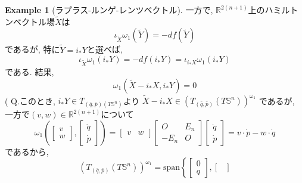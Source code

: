\documentclass[a4paper]{ujarticle}
\numberwithin{equation}{section}
\theoremstyle{definition}
\newtheorem{example}{Example}
\begin{document}
\begin{example}[ラプラス-ルンゲ-レンツベクトル]
            一方で, $\mathbb{R}^{2(n+1)}$上のハミルトンベクトル場$\tilde{X}$は
            \[
                \iota_{\tilde{X}}\omega_1(\tilde{Y}) = - d f(\tilde{Y})
            \]
            であるが, 特に$\tilde{Y} = i_{*} Y$と選べば,
            \[
                \iota_{\tilde{X}}\omega_1(i_{*}Y) = - d f(i_{*}Y) = \iota_{i_{*}X} \omega_1(i_{*}Y)
            \]
            である. 結果, 
            \[
                \omega_1(\tilde{X} - i_{*}X, i_{*}Y) = 0
            \]
            (   Q.このとき, $i_{*}Y \in T_{(\bar{q}, \bar{p})(T \mathbb{S}^n)}$より
                $\tilde{X} - i_{*}X \in (T_{(\bar{q}, \bar{p})}(T \mathbb{S}^n))^{\omega_1}$
                であるが, 一方で$(v, w) \in \mathbb{R}^{2(n+1)}$について
                \[
                    \omega_1(
                        \begin{bmatrix}
                            v \\
                            w
                        \end{bmatrix},
                        \begin{bmatrix}
                            \dot{q} \\
                            \dot{p}
                        \end{bmatrix}
                        )
                        = \begin{bmatrix}
                            v & w
                        \end{bmatrix}
                        \begin{bmatrix}
                            O & E_n \\
                            -E_n & O
                        \end{bmatrix}
                        \begin{bmatrix}
                            \dot{q} \\
                            \dot{p}
                        \end{bmatrix}
                        = v \cdot \dot{p} - w \cdot \dot{q}
                \]
                であるから, 
                \[
                        (T_{(\bar{q}, \bar{p})}(T \mathbb{S}^n))^{\omega_1} 
                        = \textrm{span} \left\{\begin{bmatrix}
                            0 \\
                            q
                        \end{bmatrix}, 
                        \begin{bmatrix}

\end{bmatrix}\]
\end{example}
\end{document}

